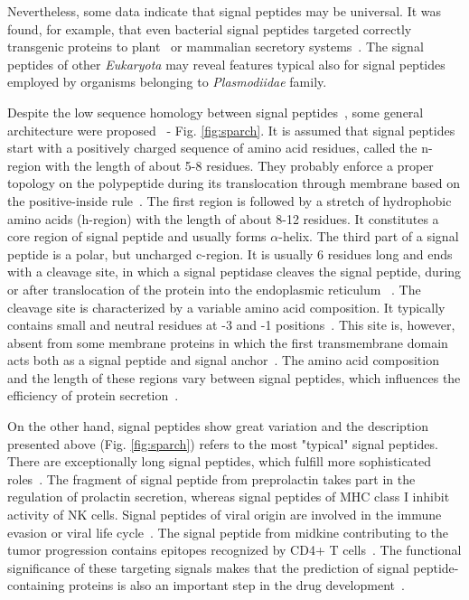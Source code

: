 \documentclass[10pt,letterpaper]{article}
\begin{document}
Nevertheless, some data indicate that signal peptides may be universal. It was found, for example, that even bacterial signal peptides targeted correctly transgenic proteins to plant~\cite{2009moellera} or mammalian secretory systems~\cite{2014naganoestablishment}. The signal peptides of other \textit{Eukaryota} may reveal features typical also for signal peptides employed by organisms belonging to \textit{Plasmodiidae} family.

Despite the low sequence homology between signal peptides~\cite{1999ladungaphysean}, some general architecture were proposed~\cite{1994izardsignal, 2013vossmechanism} - Fig. \ref{fig:sparch}. It is assumed that signal peptides start with a positively charged sequence of amino acid residues, called the n-region with the length of about 5-8 residues. They probably enforce a proper topology on the polypeptide during its translocation through membrane based on the positive-inside rule~\cite{1988vonheijnetopogenic}. The first region is followed by a stretch of hydrophobic amino acids (h-region) with the length of about 8-12 residues. It constitutes a core region of signal peptide and usually forms $\alpha$-helix. The third part of a signal peptide is a polar, but uncharged c-region. It is usually 6 residues long and ends with a cleavage site, in which a signal peptidase cleaves the signal peptide, during or after translocation of the protein into the endoplasmic reticulum ~\cite{2002paetzelsignal}. The cleavage site is characterized by a variable amino acid composition. It typically contains small and neutral residues at -3 and -1 positions~\cite{1994palzkillselection}. This site is, however, absent from some membrane proteins in which the first transmembrane domain acts both as a signal peptide and signal anchor~\cite{1988szczesnaskorupapositive}. The amino acid composition and the length of these regions vary between signal peptides, which influences the efficiency of protein secretion~\cite{2006hegdethe}.

On the other hand, signal peptides show great variation and the description presented above (Fig. \ref{fig:sparch}) refers to the most "typical" signal peptides. There are  exceptionally long signal peptides, which fulfill more sophisticated roles~\cite{2009hissarchitecture}. The fragment of signal peptide from preprolactin takes part in the regulation of prolactin secretion, whereas signal peptides of MHC class I inhibit activity of NK cells. Signal peptides of viral origin are involved in the immune evasion or viral life cycle~\cite{2000kappposttargeting}. The signal peptide from midkine contributing to the tumor progression contains epitopes recognized by CD4+ T cells~\cite{2013kerzerhothe}. The functional significance of these targeting signals makes that the prediction of signal peptide-containing proteins is also an important step in the drug development~\cite{2005zhangalteration, 2012netoadeimproving, 2010moellerwetmilling}.
\end{document}
